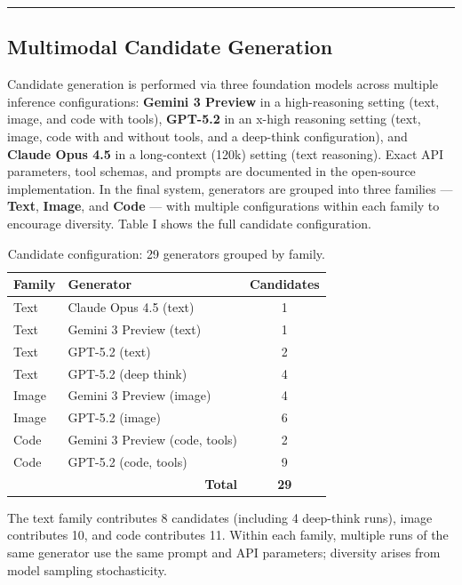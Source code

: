 \documentclass[conference]{IEEEtran}
\begin{document}
\begin{center}\rule{0.5\linewidth}{0.5pt}\end{center}

\subsection{Multimodal Candidate
Generation}\label{multimodal-candidate-generation}

Candidate generation is performed via three foundation models across
multiple inference configurations: \textbf{Gemini 3 Preview} in a
high-reasoning setting (text, image, and code with tools),
\textbf{GPT-5.2} in an x-high reasoning setting (text, image, code with
and without tools, and a deep-think configuration), and \textbf{Claude
Opus 4.5} in a long-context (120k) setting (text reasoning). Exact API
parameters, tool schemas, and prompts are documented in the open-source
implementation. In the final system, generators are grouped into three
families --- \textbf{Text}, \textbf{Image}, and \textbf{Code} --- with
multiple configurations within each family to encourage diversity. Table
I shows the full candidate configuration.

\begin{table}[htbp]
\caption{Candidate configuration: 29 generators grouped by family.}
\begin{center}
\footnotesize
\begin{tabular}{|l|l|c|}
\hline
\textbf{Family} & \textbf{Generator} & \textbf{Candidates} \\
\hline
Text & Claude Opus 4.5 (text) & 1 \\
Text & Gemini 3 Preview (text) & 1 \\
Text & GPT-5.2 (text) & 2 \\
Text & GPT-5.2 (deep think) & 4 \\
Image & Gemini 3 Preview (image) & 4 \\
Image & GPT-5.2 (image) & 6 \\
Code & Gemini 3 Preview (code, tools) & 2 \\
Code & GPT-5.2 (code, tools) & 9 \\
\hline
\multicolumn{2}{|r|}{\textbf{Total}} & \textbf{29} \\
\hline
\end{tabular}
\end{center}
\end{table}

The text family contributes 8 candidates (including 4 deep-think runs),
image contributes 10, and code contributes 11. Within each family,
multiple runs of the same generator use the same prompt and API
parameters; diversity arises from model sampling stochasticity.
\end{document}

